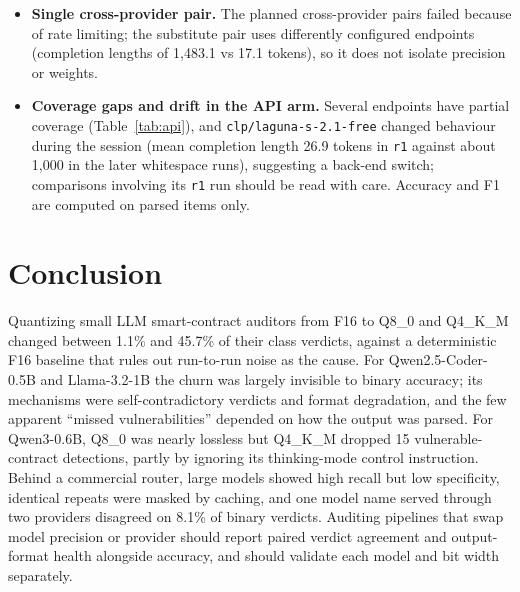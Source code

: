 \begin{itemize}
\item \textbf{Single cross-provider pair.} The planned cross-provider pairs failed because of rate limiting; the substitute pair uses differently configured endpoints (completion lengths of 1{,}483.1 vs 17.1 tokens), so it does not isolate precision or weights.
\item \textbf{Coverage gaps and drift in the API arm.} Several endpoints have partial coverage (Table~\ref{tab:api}), and \texttt{clp/laguna-s-2.1-free} changed behaviour during the session (mean completion length 26.9 tokens in \texttt{r1} against about 1{,}000 in the later whitespace runs), suggesting a back-end switch; comparisons involving its \texttt{r1} run should be read with care. Accuracy and F1 are computed on parsed items only.
\end{itemize}

\section{Conclusion}\label{sec:conclusion}
Quantizing small LLM smart-contract auditors from F16 to Q8\_0 and Q4\_K\_M changed between 1.1\% and 45.7\% of their class verdicts, against a deterministic F16 baseline that rules out run-to-run noise as the cause. For Qwen2.5-Coder-0.5B and Llama-3.2-1B the churn was largely invisible to binary accuracy; its mechanisms were self-contradictory verdicts and format degradation, and the few apparent ``missed vulnerabilities'' depended on how the output was parsed. For Qwen3-0.6B, Q8\_0 was nearly lossless but Q4\_K\_M dropped 15 vulnerable-contract detections, partly by ignoring its thinking-mode control instruction. Behind a commercial router, large models showed high recall but low specificity, identical repeats were masked by caching, and one model name served through two providers disagreed on 8.1\% of binary verdicts. Auditing pipelines that swap model precision or provider should report paired verdict agreement and output-format health alongside accuracy, and should validate each model and bit width separately.
